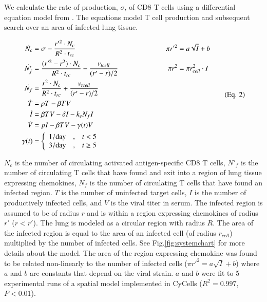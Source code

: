 \documentclass[preprint,10pt,numbers]{elsarticle}
\begin{document}

We calculate the rate of production, $\sigma$, of CD8 T cells using a differential equation model from \citep{Miao2010a}.  The equations model T cell production and subsequent search over an area of infected lung tissue.

{\footnotesize
\begin{equation*}
\label{eq:miao}
\begin{aligned}
\dot{N_{c}} &= \sigma - \frac{r'^{2} \cdot N_{c}}{R^{2} \cdot t_{rc}} & \pi r'^{2} &= a \sqrt{I} + b \\
\dot{N'_{f}} &= \frac{(r'^{2} - r^{2}) \cdot N_{c}}{R^{2} \cdot t_{rc}} - \frac{v_{tcell}}{(r' - r) / 2} \hspace*{2cm}  & \pi r^{2} &= \pi r_{cell}^{2} \cdot I \\
\dot{N_{f}} &= \frac{r^{2} \cdot N_{c}}{R^{2} \cdot t_{rc}} + \frac{v_{tcell}}{(r' - r) / 2} \\
\dot{T} &= \rho T -\beta TV \\
\dot{I} &= \beta TV - \delta I - k_{e} N_{f} I \\
\dot{V} &= pI - \beta TV - \gamma (t) V \\
\gamma (t) &= \left\{ \begin{array}{rcl}
	1/\mbox{day} & \mbox{,}  & t < 5  \\
	3/\mbox{day} & \mbox{,} & t \geq 5  
	\end{array}\right. \\
\end{aligned}
\tag{Eq. 2}
\end{equation*}
}
\vspace{0.5in}


$N_{c}$ is the number of circulating activated antigen-specific CD8 T cells, $N'_{f}$ is the number of circulating T cells that have found and exit into a region of lung tissue expressing chemokines, $N_{f}$ is the number of circulating T cells that have found an infected region. $T$ is the number of uninfected target cells, $I$ is the number of productively infected cells, and $V$ is the viral titer in serum. The infected region is assumed to be of radius $r$ and is within a region expressing chemokines of radius $r'$ ($r  < r'$). The lung is modeled as a circular region with radius $R$. The area of the infected region is equal to the area of an infected cell (of radius $r_{cell}$) multiplied by the number of infected cells. See Fig.\ref{fig:systemchart} for more details about the model.  The area of the region expressing chemokine was found to be related non-linearly to the number of infected cells ($\pi r'^{2} = a \sqrt{I} + b$) where $a$ and $b$ are constants that depend on the viral strain.  $a$ and $b$ were fit to 5 experimental runs of a spatial model implemented in CyCells ($R^2 = 0.997$, $P < 0.01$).
\end{document}
